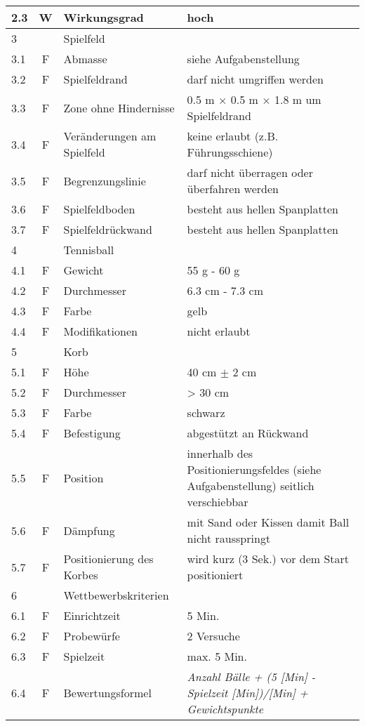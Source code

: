 \begin{longtable}[l]{|l|c|l|p{8.5cm}|}
	\hline 2.3 & W & Wirkungsgrad & hoch \\
	\hline 3 &  & Spielfeld & \\
	\hline 3.1 & F & Abmasse & siehe Aufgabenstellung \\       
	\hline 3.2 & F & Spielfeldrand & darf nicht umgriffen werden  \\
	\hline 3.3 & F & Zone ohne Hindernisse & 0.5 m $\times$ 0.5 m $\times$ 1.8 m um Spielfeldrand \\
	\hline 3.4 & F & Veränderungen am Spielfeld & keine erlaubt (z.B. Führungsschiene) \\
	\hline 3.5 & F & Begrenzungslinie & darf nicht überragen oder überfahren werden \\
	\hline 3.6 & F & Spielfeldboden & besteht aus hellen Spanplatten \\
	\hline 3.7 & F & Spielfeldrückwand & besteht aus hellen Spanplatten \\
	\hline 4 &  & Tennisball & \\
	\hline 4.1 & F & Gewicht & 55 g - 60 g  \\
	\hline 4.2 & F & Durchmesser & 6.3 cm - 7.3 cm   \\
	\hline 4.3 & F & Farbe & gelb \\
	\hline 4.4 & F & Modifikationen & nicht erlaubt  \\
	\hline 5 &  & Korb & \\
	\hline 5.1 & F & Höhe & 40 cm $\pm$ 2 cm \\        
	\hline 5.2 & F & Durchmesser & > 30 cm  \\ 
	\hline 5.3 & F & Farbe & schwarz  \\
	\hline 5.4 & F & Befestigung & abgestützt an Rückwand  \\
	\hline 5.5 & F & Position & innerhalb des Positionierungsfeldes (siehe Aufgabenstellung) seitlich verschiebbar  \\   
	\hline 5.6 & F & Dämpfung & mit Sand oder Kissen damit Ball nicht rausspringt  \\
	\hline 5.7 & F & Positionierung des Korbes & wird kurz (3 Sek.) vor dem Start positioniert  \\
	\hline 6 &  & Wettbewerbskriterien & \\
	\hline 6.1 & F & Einrichtzeit & 5 Min. \\
	\hline 6.2 & F & Probewürfe & 2 Versuche \\    
	\hline 6.3 & F & Spielzeit & max. 5 Min. \\
	\hline 6.4 & F & Bewertungsformel & \textit{Anzahl Bälle + (5 [Min] - Spielzeit [Min])/[Min] + Gewichtspunkte}  \\  

\end{longtable}
